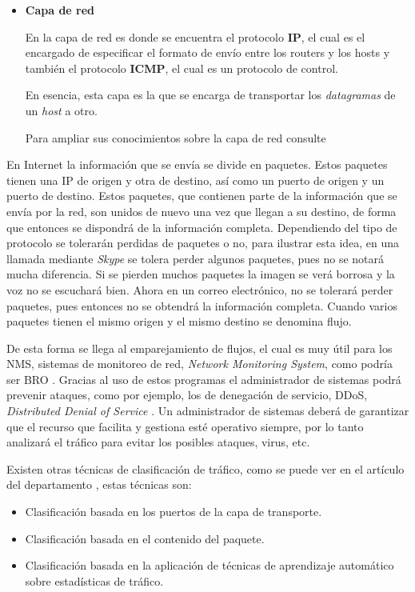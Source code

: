 \begin{itemize}
\item \textbf{Capa de red}

En la capa de red es donde se encuentra el protocolo \textbf{IP}, el cual es el encargado de especificar 
el formato de envío entre los routers y los hosts y también el protocolo \textbf{ICMP}, el cual 
es un protocolo de control.

\intro En esencia, esta capa es la que se encarga de transportar los \textit{datagramas} de un \textit{host} a otro.

\intro Para ampliar sus conocimientos sobre la capa de red consulte \cite{redes2010d}

\end{itemize}

\intro En Internet la información que se envía se divide en paquetes. Estos paquetes tienen una IP de 
origen y otra de destino, así como un puerto de origen y un puerto de destino. Estos paquetes, que contienen 
parte de la información que se envía por la red, son unidos de nuevo una vez que llegan a su destino, de forma 
que entonces se dispondrá de la información completa. Dependiendo del tipo de protocolo se tolerarán perdidas 
de paquetes o no, para ilustrar esta idea, en una llamada mediante \textit{Skype} se tolera 
perder algunos paquetes, pues no se notará mucha diferencia. Si se pierden muchos paquetes 
la imagen se verá borrosa y la voz no se escuchará bien. Ahora en un correo electrónico, 
no se tolerará perder paquetes, pues entonces no se obtendrá la información completa. Cuando 
varios paquetes tienen el mismo origen y el mismo destino se denomina flujo. \cite{redes2010a}

\intro De esta forma se llega al emparejamiento de flujos, el cual es muy útil para los NMS, 
sistemas de monitoreo de red, \textit{Network Monitoring System}, como podría ser BRO \cite{broindex}.
Gracias al uso de estos programas el administrador de sistemas podrá prevenir ataques, como por ejemplo, los 
de denegación de servicio, DDoS, \textit{Distributed Denial of Service} \cite{redes2010e}. Un administrador 
de sistemas deberá de garantizar que el recurso que facilita y gestiona esté operativo siempre, 
por lo tanto analizará el tráfico para evitar los posibles ataques, virus, etc.

\intro Existen otras técnicas de clasificación de tráfico, como se puede ver en el artículo del 
departamento \citep{comparacion}, estas técnicas son: 

\begin{itemize}
\item Clasificación basada en los puertos de la capa de transporte. \cite{iana}
\item Clasificación basada en el contenido del paquete. \cite{payload}
\item Clasificación basada en la aplicación de técnicas de aprendizaje automático sobre estadísticas 
de tráfico. \cite{learning}
\end{itemize}

